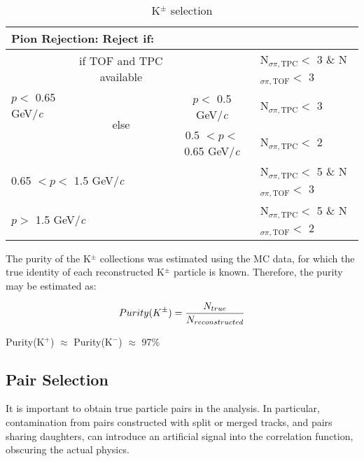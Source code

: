 \documentclass[ALICE,manyauthors]{cernphprep}
\begin{document}
\begin{table}[htbp]
\begin{tabular}{lc|c|l}
   \multicolumn{4}{l}{Pion Rejection:  Reject if:} \\
   \hline
   \multirow{3}{*}{$p <$ 0.65 GeV/\textit{c}} & if TOF and TPC available & \multicolumn{1}{c}{} & N$_{\sigma \pi,\mathrm{TPC}} <$ 3 \& N$_{\sigma \pi,\mathrm{TOF}} <$ 3 \\
   \cline{2-4}
    & \multirow{2}{*}{else} & $p <$ 0.5 GeV/\textit{c} & N$_{\sigma \pi,\mathrm{TPC}} <$ 3 \\
   \cline{3-4}
    &  & 0.5 $< p <$ 0.65 GeV/\textit{c} & N$_{\sigma \pi,\mathrm{TPC}} <$ 2 \\
   \cline{2-4}
   \multicolumn{3}{l|}{0.65 $< p <$ 1.5 GeV/\textit{c}} & N$_{\sigma \pi,\mathrm{TPC}} <$ 5 \& N$_{\sigma \pi,\mathrm{TOF}} <$ 3 \\
   \cline{2-4}
   \multicolumn{3}{l|}{$p >$ 1.5 GeV/\textit{c}} & N$_{\sigma \pi,\mathrm{TPC}} <$ 5 \& N$_{\sigma \pi,\mathrm{TOF}} <$ 2 \\
   \hline
  \end{tabular}
 \caption{K$^{\pm}$ selection}
 \label{tab:KchCuts} 
\end{table}

The purity of the K$^{\pm}$ collections was estimated using the MC data, for which the true identity of each reconstructed K$^{\pm}$ particle is known.  Therefore, the purity may be estimated as:

\begin{equation}
 Purity(K^{\pm}) = \frac{N_{true}}{N_{reconstructed}} \\
\label{eqn:KchPurity}
\end{equation}

Purity(K$^{+}$) $\approx$ Purity(K$^{-}$) $\approx$ 97\%


\subsection{Pair Selection}
\label{PairSelection}

It is important to obtain true particle pairs in the analysis.  In particular, contamination from pairs constructed with split or merged tracks, and pairs sharing daughters, can introduce an artificial signal into the correlation function, obscuring the actual physics.
\end{document}
